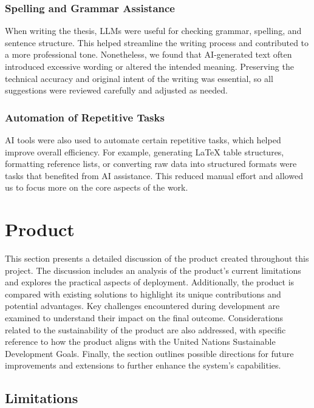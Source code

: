 \subsubsection{Spelling and Grammar Assistance}

When writing the thesis, LLMs were useful for checking grammar, spelling, and sentence structure. This helped streamline the writing process and contributed to a more professional tone. Nonetheless, we found that AI-generated text often introduced excessive wording or altered the intended meaning. Preserving the technical accuracy and original intent of the writing was essential, so all suggestions were reviewed carefully and adjusted as needed.

\subsubsection{Automation of Repetitive Tasks}

AI tools were also used to automate certain repetitive tasks, which helped improve overall efficiency. For example, generating LaTeX table structures, formatting reference lists, or converting raw data into structured formats were tasks that benefited from AI assistance. This reduced manual effort and allowed us to focus more on the core aspects of the work.

\section{Product}

This section presents a detailed discussion of the product created throughout this project. The discussion includes an analysis of the product's current limitations and explores the practical aspects of deployment. Additionally, the product is compared with existing solutions to highlight its unique contributions and potential advantages. Key challenges encountered during development are examined to understand their impact on the final outcome. Considerations related to the sustainability of the product are also addressed, with specific reference to how the product aligns with the United Nations Sustainable Development Goals. Finally, the section outlines possible directions for future improvements and extensions to further enhance the system's capabilities.

\subsection{Limitations}

